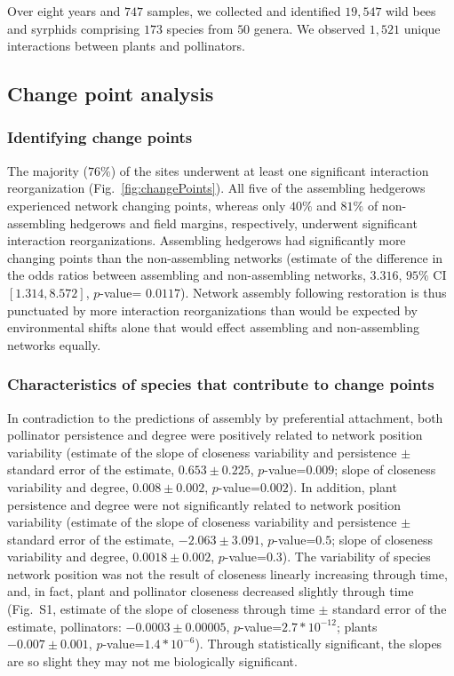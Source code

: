 \documentclass[12pt]{article}
\begin{document}
Over eight years and $747$ samples, we collected and identified
$19,547$ wild bees and syrphids comprising $173$ species from $50$
genera. We observed $1,521$ unique interactions between plants and
pollinators.

\subsection*{Change point analysis}
\subsubsection*{Identifying change points}

The majority ($76\%$) of the sites underwent at least one significant
interaction reorganization (Fig.~\ref{fig:changePoints}).  All five of
the assembling hedgerows experienced network changing points, whereas
only $40\%$ and $81\%$ of non-assembling hedgerows and field margins,
respectively, underwent significant interaction
reorganizations. Assembling hedgerows had significantly more changing
points than the non-assembling networks (estimate of the difference in
the odds ratios between assembling and non-assembling networks,
$3.316$, $95\%$ CI $[1.314, 8.572]$, $p$-value= $0.0117$). Network
assembly following restoration is thus punctuated by more interaction
reorganizations than would be expected by environmental shifts alone
that would effect assembling and non-assembling networks equally.

\subsubsection*{Characteristics of species that contribute to change
  points}

In contradiction to the predictions of assembly by preferential
attachment, both pollinator persistence and degree were positively
related to network position variability (estimate of the slope of
closeness variability and persistence $\pm$ standard error of the
estimate, $0.653 \pm 0.225$, $p$-value=$0.009$; slope of closeness
variability and degree, $0.008 \pm 0.002$, $p$-value=$0.002$). In
addition, plant persistence and degree were not significantly related
to network position variability (estimate of the slope of closeness
variability and persistence $\pm$ standard error of the estimate,
$-2.063 \pm 3.091$, $p$-value=$0.5$; slope of closeness variability
and degree, $0.0018 \pm 0.002$, $p$-value=$0.3$). The variability of
species network position was not the result of closeness linearly
increasing through time, and, in fact, plant and pollinator closeness
decreased slightly through time (Fig.~S1, estimate of the slope of
closeness through time $\pm$ standard error of the estimate,
pollinators: $-0.0003 \pm 0.00005$, $p$-value=$2.7*10^{-12}$; plants
$-0.007 \pm 0.001$, $p$-value=$1.4*10^{-6}$). Through statistically
significant, the slopes are so slight they may not me biologically
significant.
\end{document}
